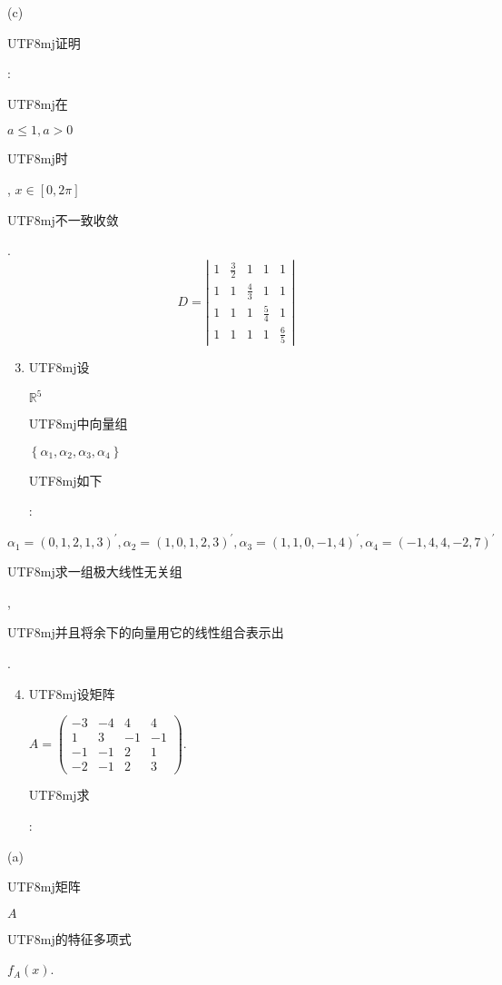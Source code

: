 \documentclass[10pt]{article}
\begin{document}
(c) \begin{CJK}{UTF8}{mj}证明\end{CJK}: \begin{CJK}{UTF8}{mj}在\end{CJK} $a \leq 1, a>0$ \begin{CJK}{UTF8}{mj}时\end{CJK}, $x \in[0,2 \pi]$ \begin{CJK}{UTF8}{mj}不一致收敛\end{CJK}.
$$
D=\left|\begin{array}{ccccc}
1 & \frac{3}{2} & 1 & 1 & 1 \\
1 & 1 & \frac{4}{3} & 1 & 1 \\
1 & 1 & 1 & \frac{5}{4} & 1 \\
1 & 1 & 1 & 1 & \frac{6}{5}
\end{array}\right|
$$

\begin{enumerate}
  \setcounter{enumi}{2}
  \item \begin{CJK}{UTF8}{mj}设\end{CJK} $\mathbb{R}^{5}$ \begin{CJK}{UTF8}{mj}中向量组\end{CJK} $\left\{\alpha_{1}, \alpha_{2}, \alpha_{3}, \alpha_{4}\right\}$ \begin{CJK}{UTF8}{mj}如下\end{CJK}:
\end{enumerate}
$$
\alpha_{1}=(0,1,2,1,3)^{\prime}, \alpha_{2}=(1,0,1,2,3)^{\prime}, \alpha_{3}=(1,1,0,-1,4)^{\prime}, \alpha_{4}=(-1,4,4,-2,7)^{\prime}
$$
\begin{CJK}{UTF8}{mj}求一组极大线性无关组\end{CJK}, \begin{CJK}{UTF8}{mj}并且将余下的向量用它的线性组合表示出\end{CJK}.

\begin{enumerate}
  \setcounter{enumi}{3}
  \item \begin{CJK}{UTF8}{mj}设矩阵\end{CJK} $A=\left(\begin{array}{cccc}-3 & -4 & 4 & 4 \\ 1 & 3 & -1 & -1 \\ -1 & -1 & 2 & 1 \\ -2 & -1 & 2 & 3\end{array}\right)$. \begin{CJK}{UTF8}{mj}求\end{CJK}:
\end{enumerate}
(a) \begin{CJK}{UTF8}{mj}矩阵\end{CJK} $A$ \begin{CJK}{UTF8}{mj}的特征多项式\end{CJK} $f_{A}(x)$.
\end{document}
